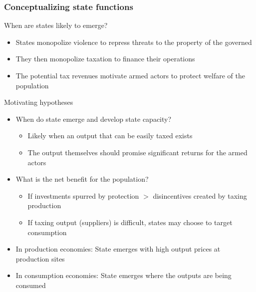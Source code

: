 \documentclass[aspectratio=169]{beamer}
\begin{document}
\begin{frame}
\frametitle{Conceptualizing state functions}
When are states likely to emerge?
\begin{itemize}\setlength\itemsep{3pt}
\item States monopolize violence to repress threats to the property of the governed
\item They then monopolize taxation to finance their operations
\item The potential tax revenues motivate armed actors to protect welfare of the population
\end{itemize}\medskip
Motivating hypotheses
\begin{itemize}\setlength\itemsep{3pt}
\item When do state emerge and develop state capacity?
\begin{itemize}
\item Likely when an output that can be easily taxed exists
\item The output themselves should promise significant returns for the armed actors
\end{itemize}
\item What is the net benefit for the population?
\begin{itemize}
\item If investments spurred by protection $>$ disincentives created by taxing production
\item If taxing output (suppliers) is difficult, states may choose to target consumption
\end{itemize}
\item In production economies: State emerges with high output prices at production sites
\item In consumption economies: State emerges where the outputs are being consumed
\end{itemize}\medskip
\end{frame}
\end{document}
